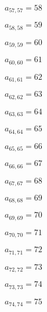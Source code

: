 \documentclass[a4paper,12pt]{article}
\begin{document}
$a _{ 57, 57 } = 58$

$a _{ 58, 58 } = 59$

$a _{ 59, 59 } = 60$

$a _{ 60, 60 } = 61$

$a _{ 61, 61 } = 62$

$a _{ 62, 62 } = 63$

$a _{ 63, 63 } = 64$

$a _{ 64, 64 } = 65$

$a _{ 65, 65 } = 66$

$a _{ 66, 66 } = 67$

$a _{ 67, 67 } = 68$

$a _{ 68, 68 } = 69$

$a _{ 69, 69 } = 70$

$a _{ 70, 70 } = 71$

$a _{ 71, 71 } = 72$

$a _{ 72, 72 } = 73$

$a _{ 73, 73 } = 74$

$a _{ 74, 74 } = 75$
\end{document}
